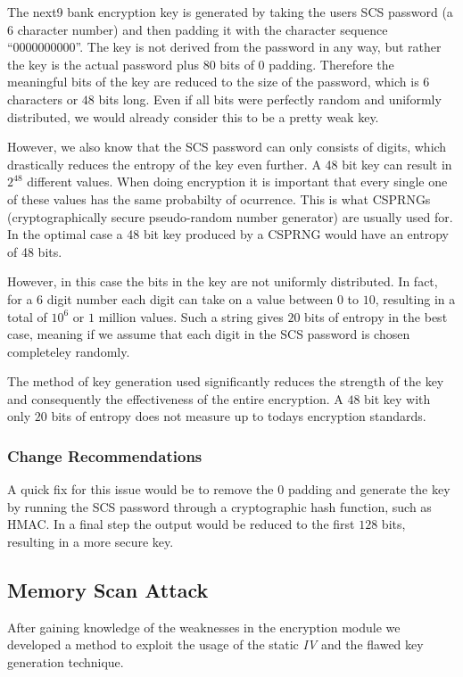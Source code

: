 \documentclass{llncs}
\begin{document}
The next9 bank encryption key is generated by taking the users SCS password (a $6$ character number) and then padding it with the character sequence ``0000000000''. The key is not derived from the password in any way, but rather the key is the actual password plus $80$ bits of $0$ padding. Therefore the meaningful bits of the key are reduced to the size of the password, which is $6$ characters or $48$ bits long. Even if all bits were perfectly random and uniformly distributed, we would already consider this to be a pretty weak key.

However, we also know that the SCS password can only consists of digits, which drastically reduces the entropy of the key even further. A 48 bit key can result in $2^{48}$ different values. When doing encryption it is important that every single one of these values has the same probabilty of ocurrence. This is what CSPRNGs (cryptographically secure pseudo-random number generator) are usually used for.  In the optimal case a 48 bit key produced by a CSPRNG would have an entropy of 48 bits.

However, in this case the bits in the key are not uniformly distributed. In fact, for a 6 digit number each digit can take on a value between $0$ to $10$, resulting in a total of $10^6$ or $1$ million values. Such a string gives $20$ bits of entropy in the best case, meaning if we assume that each digit in the SCS password is chosen completeley randomly. 

The method of key generation used significantly reduces the strength of the key and consequently the effectiveness of the entire encryption. A $48$ bit key with only $20$ bits of entropy does not measure up to todays encryption standards. 

\subsubsection{Change Recommendations}
A quick fix for this issue would be to remove the 0 padding and generate the key by running the SCS password through a cryptographic hash function, such as HMAC. In a final step the output would be reduced to the first $128$ bits, resulting in a more secure key.

\subsection{Memory Scan Attack}
\label{SecMemoryScanAttack}
After gaining knowledge of the weaknesses in the encryption module we developed a method to exploit the usage of the static \emph{IV} and the flawed key generation technique.
\end{document}
